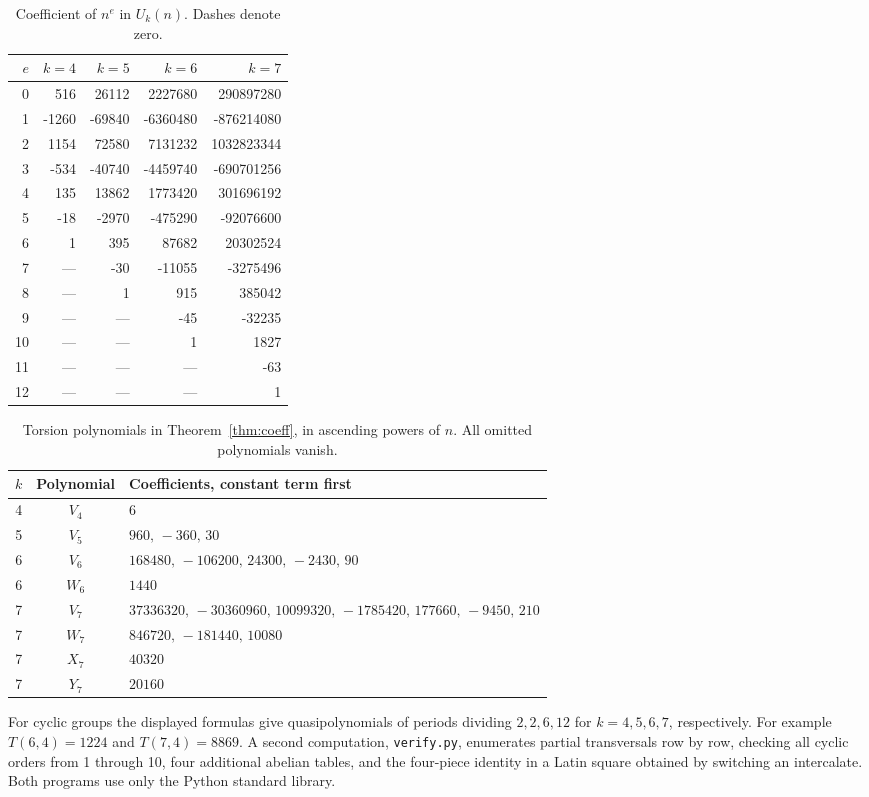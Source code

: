 \documentclass[11pt]{article}
\begin{document}
\begin{table}[H]\centering
\caption{Coefficient of $n^e$ in $U_k(n)$. Dashes denote zero.}\label{tab:ordinary}
\smallskip
\begin{tabular}{r|rrrr}\toprule
$e$ & $k=4$ & $k=5$ & $k=6$ & $k=7$\\\midrule
0 & 516 & 26112 & 2227680 & 290897280\\
1 & -1260 & -69840 & -6360480 & -876214080\\
2 & 1154 & 72580 & 7131232 & 1032823344\\
3 & -534 & -40740 & -4459740 & -690701256\\
4 & 135 & 13862 & 1773420 & 301696192\\
5 & -18 & -2970 & -475290 & -92076600\\
6 & 1 & 395 & 87682 & 20302524\\
7 & --- & -30 & -11055 & -3275496\\
8 & --- & 1 & 915 & 385042\\
9 & --- & --- & -45 & -32235\\
10 & --- & --- & 1 & 1827\\
11 & --- & --- & --- & -63\\
12 & --- & --- & --- & 1\\
\bottomrule\end{tabular}\end{table}
\begin{table}[H]\centering
\caption{Torsion polynomials in Theorem~\ref{thm:coeff}, in ascending powers of $n$. All omitted polynomials vanish.}\label{tab:torsion}
\smallskip
\begin{tabular}{rcl}\toprule
$k$ & Polynomial & Coefficients, constant term first\\\midrule
4 & $V_4$ & $6$\\
5 & $V_5$ & $960,\, -360,\, 30$\\
6 & $V_6$ & $168480,\, -106200,\, 24300,\, -2430,\, 90$\\
6 & $W_6$ & $1440$\\
7 & $V_7$ & $37336320,\, -30360960,\, 10099320,\, -1785420,\, 177660,\, -9450,\, 210$\\
7 & $W_7$ & $846720,\, -181440,\, 10080$\\
7 & $X_7$ & $40320$\\
7 & $Y_7$ & $20160$\\
\bottomrule\end{tabular}\end{table}

For cyclic groups the displayed formulas give quasipolynomials of periods dividing $2,2,6,12$ for $k=4,5,6,7$, respectively. For example $T(6,4)=1224$ and $T(7,4)=8869$. A second computation, \texttt{verify.py}, enumerates partial transversals row by row, checking all cyclic orders from 1 through 10, four additional abelian tables, and the four-piece identity in a Latin square obtained by switching an intercalate. Both programs use only the Python standard library.
\end{document}
